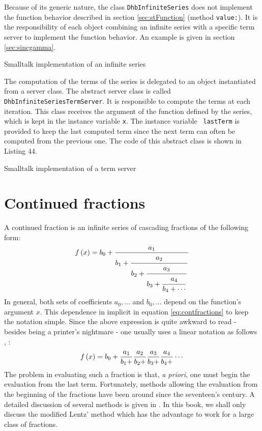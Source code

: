 \documentclass[twoside]{book}
\begin{document}
Because of its generic nature, the class {\tt DhbInfiniteSeries}
does not implement the function behavior described in section
\ref{sec:stFunction} (method {\tt value:}). It is the
responsibility of each object combining an infinite series with a
specific term server to implement the function behavior. An
example is given in section \ref{sec:sincgamma}.
\begin{listing} Smalltalk implementation of an infinite series \label{ls:infseries}

\end{listing}
The computation of the terms of the series is delegated to an
object instantiated from a server class. The abstract server class
is called {\tt DhbInfiniteSeriesTermServer}. It is responsible to
compute the terms at each iteration. This class receives the
argument of the function defined by the series, which is kept in
the instance variable {\tt x}. The instance variable {\tt
lastTerm} is provided to keep the last computed term since the
next term can often be computed from the previous one. The code of
this abstract class is shown in Listing 44.
\begin{listing} Smalltalk implementation of a term server \label{ls:termserver}

\end{listing}

\section{Continued fractions}
\label{sec:contfractions}
A continued fraction is an infinite
series of cascading fractions of the following form:
\begin{equation}
\label{eq:contfractions}
  f\left( x\right)=b_0+{a_1 \over\displaystyle b_1+
  {\strut a_2 \over\displaystyle b_2+{\strut a_3 \over\displaystyle b_3+
  {\strut a_4 \over\displaystyle b_4+\cdots}}}}
\end{equation}
In general, both sets of coefficients $a_0,\ldots$ and
$b_0,\ldots$ depend on the function's argument $x$. This
dependence in implicit in equation \ref{eq:contfractions} to keep
the notation simple. Since the above expression is quite awkward
to read - besides being a printer's nightmare - one usually uses a
linear notation as follows \cite{AbrSteg}, \cite{Press}:
\begin{equation}
\label{eq:contfractionsline}
  f\left( x\right)=b_0+{a_1 \over b_1+}{a_2 \over b_2+}{a_3 \over b_3+}{a_4 \over
  b_4+}\cdots
\end{equation}
The problem in evaluating such a fraction is that, {\it a priori},
one must begin the evaluation from the last term. Fortunately,
methods allowing the evaluation from the beginning of the
fractions have been around since the seventeen's century. A
detailed discussion of several methods is given in \cite{Press}.
In this book, we shall only discuss the modified Lentz' method
which has the advantage to work for a large class of fractions.
\end{document}
